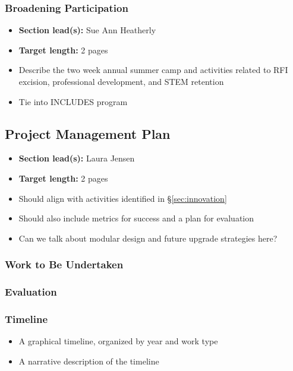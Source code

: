 \documentclass[10pt]{myNSF}
\begin{document}
\subsubsection{Broadening Participation}
\label{sec:participation}

\begin{itemize}
\item{\textbf{Section lead(s):} Sue Ann Heatherly}
\item{\textbf{Target length:} 2 pages}
\item{Describe the two week annual summer camp and activities related
  to RFI excision, professional development, and STEM retention}
\item{Tie into INCLUDES program}
\end{itemize}

\subsection{Project Management Plan}
\label{sec:plan}

\begin{itemize}
\item{\textbf{Section lead(s):} Laura Jensen}
\item{\textbf{Target length:} 2 pages}
\item{Should align with activities identified in
    \S\ref{sec:innovation}}
\item{Should also include metrics for success and a plan for evaluation}
\item{Can we talk about modular design and future upgrade strategies
  here?}
\end{itemize}

\subsubsection{Work to Be Undertaken}
\label{sec:milestones}

\subsubsection{Evaluation}
\label{sec:evaluation}

\subsubsection{Timeline}
\label{sec:timeline}

\begin{itemize}
\item{A graphical timeline, organized by year and work type}
\item{A narrative description of the timeline}
\end{itemize}
\end{document}
